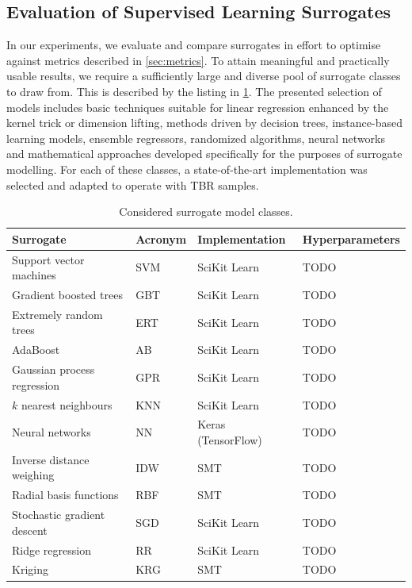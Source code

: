 \subsection{Evaluation of Supervised Learning Surrogates}
\label{sec:supervised}

In our experiments, we evaluate and compare surrogates in effort to
optimise against metrics described in \cref{sec:metrics}. To attain meaningful
and practically usable results, we require a sufficiently large and diverse pool
of surrogate classes to draw from. This is described by the listing in
\cref{tbl:surrogates}. The presented selection of models includes basic
techniques suitable for linear regression enhanced by the kernel trick or dimension
lifting, methods driven by decision trees, instance-based learning models,
ensemble regressors, randomized algorithms, neural networks and mathematical approaches
developed specifically for the purposes of surrogate modelling. For each of
these classes, a state-of-the-art implementation was selected and adapted to
operate with TBR samples.

\begin{table}[h]
	\centering
	\begin{tabular}{llll}
	\toprule
	Surrogate & Acronym & Implementation & Hyperparameters \\
	\midrule
	Support vector machines	& SVM & SciKit Learn & TODO \\
	Gradient boosted trees	& GBT & SciKit Learn & TODO \\
	Extremely random trees	& ERT & SciKit Learn & TODO \\
	AdaBoost	& AB & SciKit Learn & TODO \\
	Gaussian process regression	& GPR & SciKit Learn & TODO \\
	$k$ nearest neighbours	& KNN & SciKit Learn & TODO \\
	Neural networks	& NN & Keras (TensorFlow) & TODO \\
	Inverse distance weighing & IDW & SMT & TODO \\
	Radial basis functions & RBF & SMT & TODO \\
	Stochastic gradient descent & SGD & SciKit Learn & TODO \\
	Ridge regression & RR & SciKit Learn & TODO \\
	Kriging & KRG & SMT & TODO \\
	\bottomrule
	\end{tabular}
	\caption{Considered surrogate model classes.}
	\label{tbl:surrogates}
\end{table}


